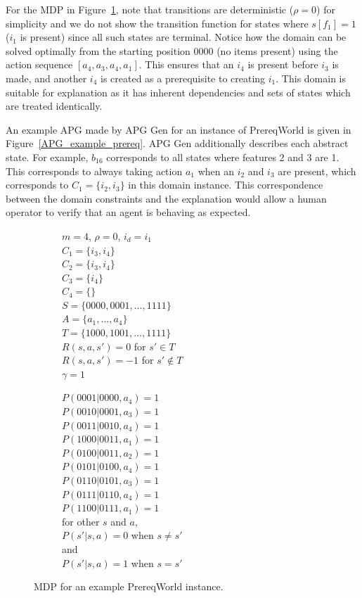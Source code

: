 \documentclass[letterpaper]{article} %
\begin{document}
For the MDP in Figure~\ref{prereqworld_example_MDP},
note that transitions are deterministic ($\rho = 0$) for simplicity and we do not show the transition function for states where $s[f_1] = 1$ ($i_1$ is present) since all such states are terminal.
Notice how the domain can be solved optimally from the starting position $0000$ (no items present) using the action sequence $[a_4, a_3, a_4, a_1]$.
This ensures that an $i_4$ is present before $i_3$ is made, and another $i_4$ is created as a prerequisite to creating $i_1$.
This domain is suitable for explanation as it has inherent dependencies and sets of states which are treated identically.

An example APG made by APG Gen for an instance of PrereqWorld is given in Figure~\ref{APG_example_prereq}. APG Gen additionally describes each abstract state. For example, $b_{16}$ corresponds to all states where features 2 and 3 are 1. This corresponds to always taking action $a_1$ when an $i_2$ and $i_3$ are present, which corresponds to $C_1 = \{i_2, i_3\}$ in this domain instance. This correspondence between the domain constraints and the explanation would allow a human operator to verify that an agent is behaving as expected.

\begin{figure}[ht]
\begin{subfigure}[t]{0.5 \linewidth}
$m = 4$, $\rho = 0$, $i_d=i_1$ \\
$C_1 = \{i_3,i_4\}$\\
$C_2 = \{i_3,i_4\}$\\
$C_3 = \{i_4\}$\\
$C_4 = \{\}$\\
$S = \{0000, 0001, \ldots, 1111 \}$\\
$A = \{a_1, \ldots, a_4\}$\\
$T = \{1000, 1001, \ldots, 1111 \}$ \\
$R(s, a, s') = 0$ for $s' \in T$\\
$R(s, a, s') = -1$ for $s' \not \in T$\\
$\gamma = 1$
\end{subfigure}%
\begin{subfigure}[t]{0.5 \linewidth}
$P(0001 | 0000, a_4) = 1$\\
$P(0010 | 0001, a_3) = 1$\\
$P(0011 | 0010, a_4) = 1$\\
$P(1000 | 0011, a_1) = 1$\\
$P(0100 | 0011, a_2) = 1$\\
$P(0101 | 0100, a_4) = 1$\\
$P(0110 | 0101, a_3) = 1$\\
$P(0111 | 0110, a_4) = 1$\\
$P(1100 | 0111, a_1) = 1$\\
for other $s$ and $a$, \\
$P(s' | s, a) = 0$ when $s \neq s'$ \\
and \\
$P(s' | s, a) = 1$ when $s = s'$\\
\end{subfigure}
\caption{MDP for an example PrereqWorld instance.} \label{prereqworld_example_MDP}
\end{figure}
\end{document}
